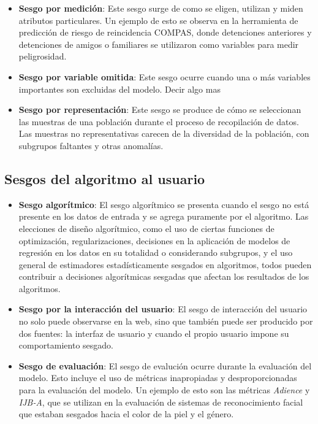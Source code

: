     \begin{itemize}
        \item \textbf{Sesgo por medici\'on}: Este sesgo surge de como se eligen, utilizan y miden atributos particulares. Un ejemplo de esto se observa 
        en la herramienta de predicci\'on de riesgo de reincidencia COMPAS, donde detenciones anteriores y detenciones de amigos o familiares se utilizaron 
        como variables para medir peligrosidad.
        
        \item \textbf{Sesgo por variable omitida}: Este sesgo ocurre cuando una o m\'as variables importantes son excluidas del modelo. Decir algo mas
        
        \item \textbf{Sesgo por representaci\'on}: Este sesgo se produce de c\'omo se seleccionan las muestras de una poblaci\'on durante el proceso de
        recopilaci\'on de datos. Las muestras no representativas carecen de la diversidad de la poblaci\'on, con subgrupos faltantes y otras anomal\'ias.
    \end{itemize}
    
    \subsection{Sesgos del algoritmo al usuario}

    \begin{itemize}
        \item \textbf{Sesgo algor\'itmico}: El sesgo algor\'itmico se presenta cuando el sesgo no est\'a presente en los datos de entrada
        y se agrega puramente por el algoritmo. Las elecciones de dise\~no algor\'itmico, como el uso de ciertas funciones de optimizaci\'on, 
        regularizaciones, decisiones en la aplicaci\'on de modelos de regresi\'on en los datos en su totalidad o considerando subgrupos, y el uso
        general de estimadores estad\'isticamente sesgados en algoritmos, todos pueden contribuir a decisiones algor\'itmicas sesgadas que 
        afectan los resultados de los algoritmos. 
        
        \item \textbf{Sesgo por la interacci\'on del usuario}: El sesgo de interacci\'on del usuario no solo puede observarse en la web, sino que 
        tambi\'en puede ser producido por dos fuentes: la interfaz de usuario y cuando el propio usuario impone su comportamiento sesgado.
        
        \item \textbf{Sesgo de evaluaci\'on}: El sesgo de evaluci\'on ocurre durante la evaluaci\'on del modelo. Esto incluye el uso de m\'etricas
        inapropiadas y desproporcionadas para la evaluaci\'on del modelo. Un ejemplo de esto son las m\'etricas \textit{Adience} y \textit{IJB-A}, 
        que se utilizan en la evaluaci\'on de sistemas de reconocimiento facial que estaban sesgados hacia el color de la piel y el g\'enero.
    \end{itemize}
    
